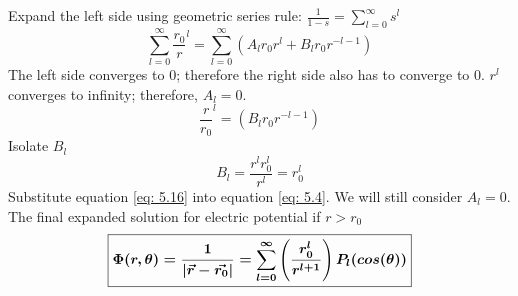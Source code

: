 \documentclass[12pt]{article}
\begin{document}
    Expand the left side using geometric series rule: $\frac{1}{1-s} = \sum_{l=0}^{\infty} s^l$
    \begin{equation} \label{eq: 5.14}
        \sum_{l=0}^{\infty} {\frac{r_0}{r}}^l =\sum_{l=0}^{\infty} (A_l r_0 r^l + B_l r_0 r^{-l-1})
    \end{equation}
    The left side converges to 0; therefore the right side also has to converge to 0. $r^l$ converges to infinity; therefore, $A_l=0$.
    \begin{equation} \label{eq: 5.15}
        {\frac{r}{r_0}}^l = (B_l r_0 r^{-l-1})
    \end{equation}
    Isolate $B_l$
    \begin{equation} \label{eq: 5.16}
        B_l = \frac{r^l r_0^l}{r^l} = r_0^l
    \end{equation}
    Substitute equation \ref{eq: 5.16} into equation \ref{eq: 5.4}. We will still consider $A_l=0$. 
    \newline The final expanded solution for electric potential if $\boxed{r>r_0}$
    \begin{equation} \label{eq: 5.17}
        \boxed{\boldsymbol{\Phi(r,\theta) = \frac{1}{\abs{\vec{r} - \vec{r_0}}} = \sum_{l=0}^{\infty} \left(\frac{r_0^l}{r^{l+1}}\right) P_l (cos(\theta))}}
    \end{equation}
\end{document}
